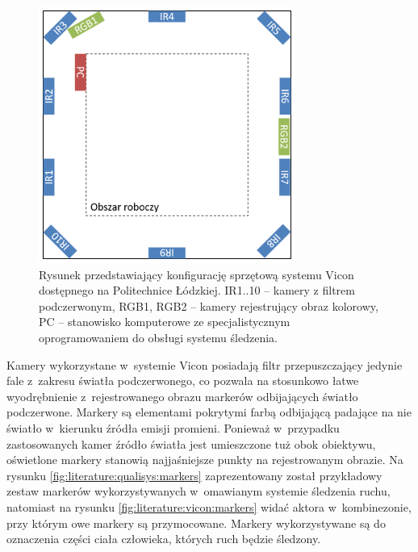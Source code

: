 \begin{savenotes}
								
	\begin{figure}[!htb]
		\centering	
		\includegraphics[width=0.75\textwidth]{images/viconSetup.png}
		\caption{Rysunek przedstawiający konfigurację sprzętową systemu Vicon dostępnego na Politechnice Łódzkiej. IR1..10 -- kamery z filtrem podczerwonym, RGB1, RGB2 -- kamery rejestrujący obraz kolorowy, PC -- stanowisko komputerowe ze specjalistycznym oprogramowaniem do obsługi systemu śledzenia.}
		\label{fig:literature:vicon:lutSetup}
	\end{figure}
							
\end{savenotes}
	
Kamery wykorzystane w~systemie Vicon posiadają filtr przepuszczający jedynie fale z~zakresu światła podczerwonego, co pozwala na stosunkowo łatwe wyodrębnienie z~rejestrowanego obrazu markerów odbijających światło podczerwone. Markery są elementami pokrytymi farbą odbijającą padające na nie światło w~kierunku źródła emisji promieni. Ponieważ w~przypadku zastosowanych kamer źródło światła jest umieszczone tuż obok obiektywu, oświetlone markery stanowią najjaśniejsze punkty na rejestrowanym obrazie. Na rysunku \ref{fig:literature:qualisys:markers} zaprezentowany został przykładowy zestaw markerów wykorzystywanych w~omawianym systemie śledzenia ruchu, natomiast na rysunku \ref{fig:literature:vicon:markers} widać aktora w~kombinezonie, przy którym owe markery są przymocowane. Markery wykorzystywane są do oznaczenia części ciała człowieka, których ruch będzie śledzony.
	
